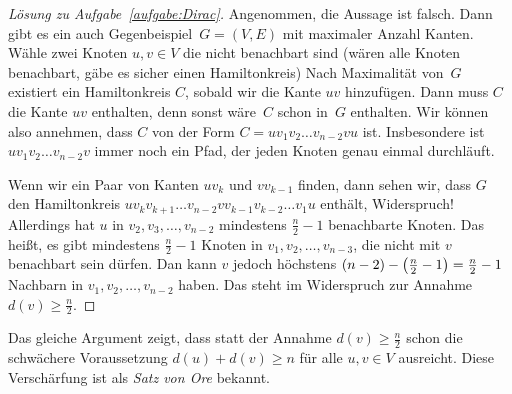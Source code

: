 \begin{proof}[Lösung zu Aufgabe~\ref{aufgabe:Dirac}]
	Angenommen, die Aussage ist falsch. Dann gibt es ein auch Gegenbeispiel~$G=(V,E)$ mit maximaler Anzahl Kanten. Wähle zwei Knoten $u,v\in V$ die nicht benachbart sind (wären alle Knoten benachbart, gäbe es sicher einen Hamiltonkreis) Nach Maximalität von~$G$ existiert ein Hamiltonkreis $C$, sobald wir die Kante $uv$ hinzufügen. Dann muss $C$ die Kante $uv$ enthalten, denn sonst wäre~$C$ schon in~$G$ enthalten. Wir können also annehmen, dass $C$ von der Form $C=uv_1v_2\dotso v_{n-2}vu$ ist. Insbesondere ist $uv_1v_2\dots v_{n-2}v$ immer noch ein Pfad, der jeden Knoten genau einmal durchläuft. 
	\begin{figure}[ht]
		\centering
	\end{figure}
	
	Wenn wir ein Paar von Kanten $uv_k$ und $vv_{k-1}$ finden, dann sehen wir, dass $G$ den Hamiltonkreis $uv_kv_{k+1}\dots v_{n-2}vv_{k-1}v_{k-2}\dots v_1u$ enthält, Widerspruch! Allerdings hat $u$ in $v_2,v_3,\dots,v_{n-2}$ mindestens $\frac{n}{2}-1$ benachbarte Knoten. Das heißt, es gibt mindestens $\frac{n}{2}-1$ Knoten in $v_1,v_2,\dots, v_{n-3}$, die nicht mit $v$ benachbart sein dürfen. Dan kann $v$ jedoch höchstens $(n-2)-\parens[\big]{\frac{n}{2}-1}=\frac{n}{2}-1$ Nachbarn in $v_1,v_2,\dots, v_{n-2}$ haben. Das steht im Widerspruch zur Annahme $d(v)\geqslant \frac n2$.
\end{proof}
Das gleiche Argument zeigt, dass statt der Annahme $d(v)\geqslant \frac n2$ schon die schwächere Voraussetzung $d(u)+d(v)\geqslant n$ für alle $u,v\in V$ ausreicht. Diese Verschärfung ist als \emph{Satz von Ore} bekannt.